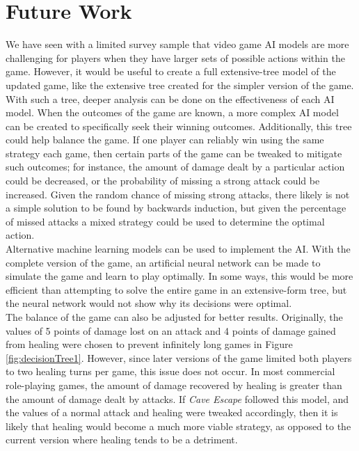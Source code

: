 \chapter{Future Work}
We have seen with a limited survey sample that video game AI models are more challenging for players when they have larger sets of possible actions within the game. However, it would be useful to create a full extensive-tree model of the updated game, like the extensive tree created for the simpler version of the game. With such a tree, deeper analysis can be done on the effectiveness of each AI model. When the outcomes of the game are known, a more complex AI model can be created to specifically seek their winning outcomes. Additionally, this tree could help balance the game. If one player can reliably win using the same strategy each game, then certain parts of the game can be tweaked to mitigate such outcomes; for instance, the amount of damage dealt by a particular action could be decreased, or the probability of missing a strong attack could be increased. Given the random chance of missing strong attacks, there likely is not a simple solution to be found by backwards induction, but given the percentage of missed attacks a mixed strategy could be used to determine the optimal action.\\

Alternative machine learning models can be used to implement the AI. With the complete version of the game, an artificial neural network can be made to simulate the game and learn to play optimally. In some ways, this would be more efficient than attempting to solve the entire game in an extensive-form tree, but the neural network would not show why its decisions were optimal.\\

The balance of the game can also be adjusted for better results. Originally, the values of 5 points of damage lost on an attack and 4 points of damage gained from healing were chosen to prevent infinitely long games in Figure \ref{fig:decisionTree1}. However, since later versions of the game limited both players to two healing turns per game, this issue does not occur. In most commercial role-playing games, the amount of damage recovered by healing is greater than the amount of damage dealt by attacks. If \textit{Cave Escape} followed this model, and the values of a normal attack and healing were tweaked accordingly, then it is likely that healing would become a much more viable strategy, as opposed to the current version where healing tends to be a detriment.